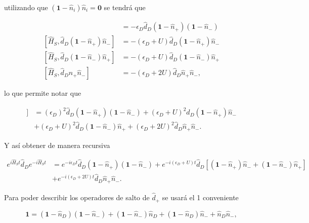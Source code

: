\begin{appendixs}
utilizando que $(\textbf{1} - \hat{n}_{i})\hat{n}_{i} = \textbf{0}$ se tendrá que

\begin{align*}
    [\hat{H}_{S},\hat{d}_{D}(\textbf{1}-\hat{n}_{+})(\textbf{1} - \hat{n}_{-})] & = - \epsilon_{D}\hat{d}_{D}(\textbf{1}-\hat{n}_{+})(\textbf{1} - \hat{n}_{-}) \\
    [\hat{H}_{S},\hat{d}_{D}(\textbf{1}-\hat{n}_{+})\hat{n}_{-}] & = - (\epsilon_{D} + U)\hat{d}_{D}(\textbf{1} - \hat{n}_{+})\hat{n}_{-} \\
    [\hat{H}_{S},\hat{d}_{D}(\textbf{1}-\hat{n}_{-})\hat{n}_{+}] & = - (\epsilon_{D} + U)\hat{d}_{D}(\textbf{1} - \hat{n}_{-})\hat{n}_{+} \\
    [\hat{H}_{S},\hat{d}_{D}\hat{n}_{+}\hat{n}_{-}] & = - (\epsilon_{D} + 2U)\hat{d}_{D}\hat{n}_{+}\hat{n}_{-}, 
\end{align*}

lo que permite notar que

\begin{align*}
    [\hat{H}_{S},[\hat{H}_{S},\hat{d}_{D}]] & = (\epsilon_{D})^{2}\hat{d}_{D}(\textbf{1} - \hat{n}_{+}) (\textbf{1} - \hat{n}_{-}) + (\epsilon_{D} + U)^{2}\hat{d}_{D}(\textbf{1} - \hat{n}_{+})\hat{n}_{-} \\
        & + (\epsilon_{D}+U)^{2}\hat{d}_{D}(\textbf{1} - \hat{n}_{-})\hat{n}_{+} + (\epsilon_{D} + 2U)^{2}\hat{d}_{D}\hat{n}_{+}\hat{n}_{-}.
\end{align*}

Y así obtener de manera recursiva

\begin{align*}
    e^{i \hat{H}_{S}t}\hat{d}_{D}e^{-i\hat{H}_{S}t}  & = e^{-i\epsilon_{D}t} \hat{d}_{D}(\textbf{1} - \hat{n}_{+}) (\textbf{1} - \hat{n}_{-}) +  e^{-i(\epsilon_{D}+U)t} \hat{d}_{D}[(\textbf{1} - \hat{n}_{+})\hat{n}_{-} + (\textbf{1} - \hat{n}_{-})\hat{n}_{+}] \\
    & + e^{-i(\epsilon_{D} + 2U)t}\hat{d}_{D} \hat{n}_{+}\hat{n}_{-}.
\end{align*}

Para poder describir los operadores de salto de $\hat{d}_{+}$ se usará el 1 conveniente

\begin{equation*}
    \textbf{1} = (\textbf{1}-\hat{n}_{D})(\textbf{1}-\hat{n}_{-}) + (\textbf{1}-\hat{n}_{-})\hat{n}_{D} + (\textbf{1}-\hat{n}_{D})\hat{n}_{-} + \hat{n}_{D}\hat{n}_{-},
\end{equation*}


\end{appendixs}
